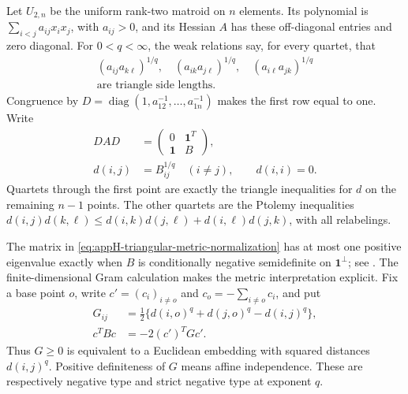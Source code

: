 Let $U_{2,n}$ be the uniform rank-two matroid on $n$ elements.
Its polynomial is $\sum_{i<j}a_{ij}x_ix_j$, with $a_{ij}>0$,
and its Hessian $A$ has these off-diagonal entries and zero
diagonal. For $0<q<\infty$, the weak relations say, for every
quartet, that
\begin{equation*}
 \begin{gathered}
 (a_{ij}a_{k\ell})^{1/q},\quad
 (a_{ik}a_{j\ell})^{1/q},\quad
 (a_{i\ell}a_{jk})^{1/q}\\
 \text{are triangle side lengths}.
 \end{gathered}
 \tag{H.102}\label{eq:appH-triangular-quartet}
\end{equation*}
Congruence by $D=\operatorname{diag}(1,a_{12}^{-1},\ldots,
a_{1n}^{-1})$ makes the first row equal to one. Write
\begin{equation*}
 \begin{aligned}
 DAD&=\begin{pmatrix}0&\mathbf1^T\\\mathbf1&B\end{pmatrix},\\
 d(i,j)&=B_{ij}^{1/q}\quad(i\ne j),\qquad d(i,i)=0.
 \end{aligned}
 \tag{H.103}\label{eq:appH-triangular-metric-normalization}
\end{equation*}
Quartets through the first point are exactly the triangle
inequalities for $d$ on the remaining $n-1$ points. The other
quartets are the Ptolemy inequalities
$d(i,j)d(k,\ell)\leq d(i,k)d(j,\ell)+d(i,\ell)d(j,k)$,
with all relabelings.

The matrix in \eqref{eq:appH-triangular-metric-normalization}
has at most one positive eigenvalue exactly when $B$ is
conditionally negative semidefinite on $\mathbf1^\perp$;
see \cite[Lemma~4.7]{BakerHuhKummerLorscheid26AnalyticV2}.
The finite-dimensional Gram calculation makes the metric
interpretation explicit. Fix a base point $o$, write
$c'=(c_i)_{i\ne o}$ and $c_o=-\sum_{i\ne o}c_i$, and put
\begin{equation*}
 \begin{aligned}
 G_{ij}&=\tfrac12\{d(i,o)^q+d(j,o)^q-d(i,j)^q\},\\
 c^TBc&=-2(c')^TGc'.
 \end{aligned}
 \tag{H.104}\label{eq:appH-triangular-Gram}
\end{equation*}
Thus $G\geq0$ is equivalent to a Euclidean embedding with
squared distances $d(i,j)^q$. Positive definiteness of $G$
means affine independence. These are respectively negative
type and strict negative type at exponent $q$.

